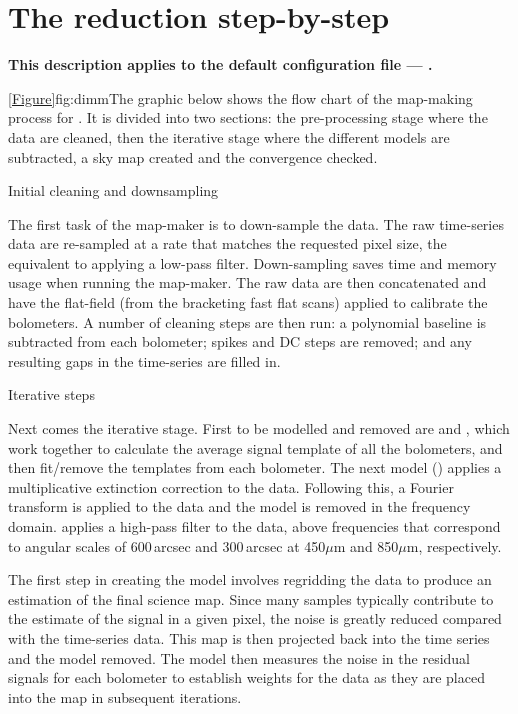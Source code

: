 \section{The reduction step-by-step}

\textbf{This description applies to the default configuration file ---
  .}

\cref{Figure}{fig:dimm}{The graphic below} shows the flow chart of the
map-making process for . It is divided into two
sections: the pre-processing stage where the data are cleaned, then
the iterative stage where the different models are subtracted, a sky
map created and the convergence checked.



\begin{enumdesc}
\item[Initial cleaning and downsampling]

  The first task of the map-maker is to down-sample the data. The raw
  time-series data are re-sampled at a rate that matches the requested
  pixel size, the equivalent to applying a low-pass filter.
  Down-sampling saves time and memory usage when running the
  map-maker.  The raw data are then concatenated and have the
  flat-field (from the bracketing fast flat scans) applied to
  calibrate the bolometers. A number of cleaning steps are then run: a
  polynomial baseline is subtracted from each bolometer; spikes and DC
  steps are removed; and any resulting gaps in the time-series are
  filled in.

\item[Iterative steps]

  Next comes the iterative stage. First to be modelled and removed are
   and , which work together to calculate the
  average signal template of all the bolometers, and then fit/remove
  the templates from each bolometer. The next model ()
  applies a multiplicative extinction correction to the
  data. Following this, a Fourier transform is applied to the data and
  the  model is removed in the frequency domain.
   applies a high-pass filter to the data, above
  frequencies that correspond to angular scales of 600\,arcsec and
  300\,arcsec at 450$\mu$m and 850$\mu$m, respectively.


  The first step in creating the  model involves regridding
  the data to produce an estimation of the final science map.  Since
  many samples typically contribute to the estimate of the signal in a
  given pixel, the noise is greatly reduced compared with the
  time-series data. This map is then projected back into the time
  series and the  model removed. The  model then
  measures the noise in the residual signals for each bolometer to
  establish weights for the data as they are placed into the map in
  subsequent iterations.



\end{enumdesc}
